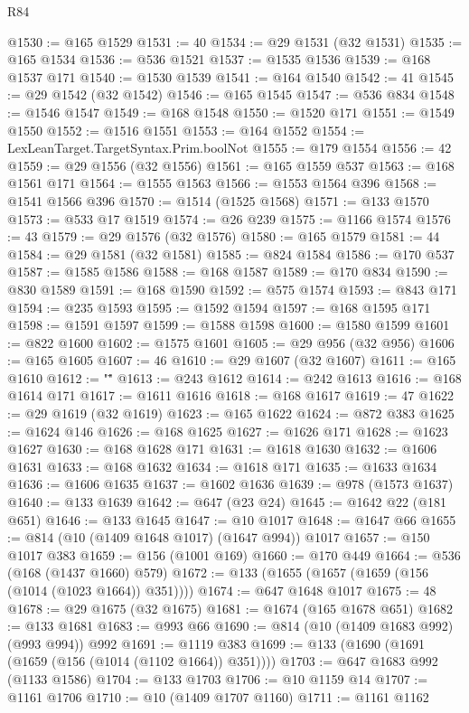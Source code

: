 \begin{lexlean}{R84}
\begin{coremodule}
@1530 := @165 @1529
@1531 := 40
@1534 := @29 @1531 (@32 @1531)
@1535 := @165 @1534
@1536 := @536 @1521
@1537 := @1535 @1536
@1539 := @168 @1537 @171
@1540 := @1530 @1539
@1541 := @164 @1540
@1542 := 41
@1545 := @29 @1542 (@32 @1542)
@1546 := @165 @1545
@1547 := @536 @834
@1548 := @1546 @1547
@1549 := @168 @1548
@1550 := @1520 @171
@1551 := @1549 @1550
@1552 := @1516 @1551
@1553 := @164 @1552
@1554 := LexLeanTarget.TargetSyntax.Prim.boolNot
@1555 := @179 @1554
@1556 := 42
@1559 := @29 @1556 (@32 @1556)
@1561 := @165 @1559 @537
@1563 := @168 @1561 @171
@1564 := @1555 @1563
@1566 := @1553 @1564 @396
@1568 := @1541 @1566 @396
@1570 := @1514 (@1525 @1568)
@1571 := @133 @1570
@1573 := @533 @17 @1519
@1574 := @26 @239
@1575 := @1166 @1574
@1576 := 43
@1579 := @29 @1576 (@32 @1576)
@1580 := @165 @1579
@1581 := 44
@1584 := @29 @1581 (@32 @1581)
@1585 := @824 @1584
@1586 := @170 @537
@1587 := @1585 @1586
@1588 := @168 @1587
@1589 := @170 @834
@1590 := @830 @1589
@1591 := @168 @1590
@1592 := @575 @1574
@1593 := @843 @171
@1594 := @235 @1593
@1595 := @1592 @1594
@1597 := @168 @1595 @171
@1598 := @1591 @1597
@1599 := @1588 @1598
@1600 := @1580 @1599
@1601 := @822 @1600
@1602 := @1575 @1601
@1605 := @29 @956 (@32 @956)
@1606 := @165 @1605
@1607 := 46
@1610 := @29 @1607 (@32 @1607)
@1611 := @165 @1610
@1612 := "\""
@1613 := @243 @1612
@1614 := @242 @1613
@1616 := @168 @1614 @171
@1617 := @1611 @1616
@1618 := @168 @1617
@1619 := 47
@1622 := @29 @1619 (@32 @1619)
@1623 := @165 @1622
@1624 := @872 @383
@1625 := @1624 @146
@1626 := @168 @1625
@1627 := @1626 @171
@1628 := @1623 @1627
@1630 := @168 @1628 @171
@1631 := @1618 @1630
@1632 := @1606 @1631
@1633 := @168 @1632
@1634 := @1618 @171
@1635 := @1633 @1634
@1636 := @1606 @1635
@1637 := @1602 @1636
@1639 := @978 (@1573 @1637)
@1640 := @133 @1639
@1642 := @647 (@23 @24)
@1645 := @1642 @22 (@181 @651)
@1646 := @133 @1645
@1647 := @10 @1017
@1648 := @1647 @66
@1655 := @814 (@10 (@1409 @1648 @1017) (@1647 @994)) @1017
@1657 := @150 @1017 @383
@1659 := @156 (@1001 @169)
@1660 := @170 @449
@1664 := @536 (@168 (@1437 @1660) @579)
@1672 := @133 (@1655 (@1657 (@1659 (@156 (@1014 (@1023 @1664)) @351))))
@1674 := @647 @1648 @1017
@1675 := 48
@1678 := @29 @1675 (@32 @1675)
@1681 := @1674 (@165 @1678 @651)
@1682 := @133 @1681
@1683 := @993 @66
@1690 := @814 (@10 (@1409 @1683 @992) (@993 @994)) @992
@1691 := @1119 @383
@1699 := @133 (@1690 (@1691 (@1659 (@156 (@1014 (@1102 @1664)) @351))))
@1703 := @647 @1683 @992 (@1133 @1586)
@1704 := @133 @1703
@1706 := @10 @1159 @14
@1707 := @1161 @1706
@1710 := @10 (@1409 @1707 @1160)
@1711 := @1161 @1162

\end{coremodule}
\end{lexlean}
